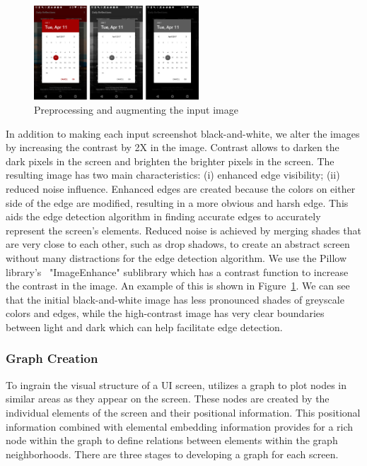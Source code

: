 \begin{figure}[h]
    \centering
    \includegraphics[width=0.55\textwidth]{imgs/PreProcessing.png}
    \caption{Preprocessing and augmenting the input image}
    \label{preprocessing}
\end{figure}



In addition to making each input screenshot black-and-white, we alter the images by increasing the contrast by 2X in the image. Contrast allows \FRAME to darken the dark pixels in the screen and brighten the brighter pixels in the screen. The resulting image has two main characteristics: (i) enhanced edge visibility; (ii) reduced noise influence. Enhanced edges are created because the colors on either side of the edge are modified, resulting in a more obvious and harsh edge. This aids the edge detection algorithm in finding accurate edges to accurately represent the screen's elements. Reduced noise is achieved by merging shades that are very close to each other, such as drop shadows, to create an abstract screen without many distractions for the edge detection algorithm. We use the Pillow library's~\cite{pillow} "ImageEnhance" sublibrary which has a contrast function to increase the contrast in the image. An example of this is shown in Figure~\ref{preprocessing}. We can see that the initial black-and-white image has less pronounced shades of greyscale colors and edges, while the high-contrast image has very clear boundaries between light and dark which can help facilitate edge detection. 


\subsubsection{Graph Creation}

To ingrain the visual structure of a UI screen, \FRAME utilizes a graph to plot nodes in similar areas as they appear on the screen. These nodes are created by the individual elements of the screen and their positional information. This positional information combined with elemental embedding information provides for a rich node within the graph to define relations between elements within the graph neighborhoods. There are three stages to developing a graph for each screen. 


